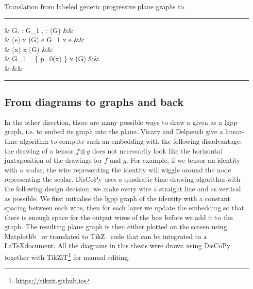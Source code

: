 \begin{python}\label{listing:lgpp2diagram}
{\normalfont Translation from labeled generic progressive plane graphs to .}
\vspace{5pt}
\hrule
\vspace{-15pt}
\begin{flalign*}
 \s &  \s G, \s \lambda : G_1 \to {}, \s \lambda : \boxes(G) \to {} \s {}&&\\
& \py{dom = [} \s \lambda(e) \s {} \s x \in \dom(G) \s {} \s e \in G_1 \s {} \s x \in \partial e \s \py{]}&&\\
& \py{boxes = [} \s \lambda(x) \s {} \s x \in \boxes(G) \s \py{]}&&\\
& \py{offsets = [len(} \s G_1 \ \cap \ \{ p_0(x) \} \times \R \s {} \s x \in \boxes(G) \s \py{]}&&\\
&  &&
\vspace{-10pt}
\end{flalign*}
\hrule
\end{python}

\subsection{From diagrams to graphs and back}

In the other direction, there are many possible ways to draw a given  as a lgpp graph, i.e. to embed its graph into the plane.
Vicary and Delpeuch \cite{DelpeuchVicary18} give a linear-time algorithm to compute such an embedding with the following disadvantage: the drawing of a tensor $f \otimes g$ does not necessarily look like the horizontal juxtaposition of the drawings for $f$ and $g$.
For example, if we tensor an identity with a scalar, the wire representing the identity will wiggle around the node representing the scalar.
DisCoPy uses a quadratic-time drawing algorithm with the following design decision: we make every wire a straight line and as vertical as possible.
We first initialise the lgpp graph of the identity with a constant spacing between each wire, then for each layer we update the embedding so that there is enough space for the output wires of the box before we add it to the graph.
The resulting plane graph is then either plotted on the screen using Matplotlib~\cite{Hunter07} or translated to TikZ~\cite{Tantau13} code that can be integrated to a \LaTeX document.
All the diagrams in this thesis were drawn using DisCoPy together with TikZiT\footnote{\url{https://tikzit.github.io}} for manual editing.

